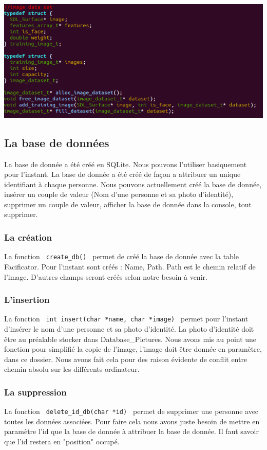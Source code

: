 \documentclass[12pt,a4paper]{article}
\begin{document}
\vspace{0.8cm}
\includegraphics[scale=.5]{Pictures/sdl2.png}
\vspace{0.8cm}

\newpage
\subsection{La base de données}
La base de donnée a été créé en SQLite. Nous pouvons l'utiliser basiquement pour l'instant. La base de donnée a été créé de façon a attribuer un unique identifiant à chaque personne. Nous pouvons actuellement créé la base de donnée, insérer un couple de valeur (Nom d'une personne et sa photo d'identité), supprimer un couple de valeur, afficher la base de donnée dans la console, tout supprimer.

\subsubsection{La création}
La fonction \verb| create_db() | permet de créé la base de donnée avec la table Facificator. Pour l'instant sont créés : Name, Path. Path est le chemin relatif de l'image. D'autres champs seront créés selon notre besoin à venir.

\subsubsection{L'insertion}
La fonction \verb| int insert(char *name, char *image) | permet pour l'instant d'insérer le nom d'une personne et sa photo d'identité. La photo d'identité doit être au préalable stocker dans Database\_Pictures. Nous avons mis au point une fonction pour simplifié la copie de l'image, l'image doit être donnée en paramètre, dans ce dossier. Nous avons fait cela pour des raison évidente de conflit entre chemin absolu sur les différents ordinateur.
\subsubsection{La suppression}
La fonction \verb| delete_id_db(char *id) | permet de supprimer une personne avec toutes les données associées. Pour faire cela nous avons juste besoin de mettre en paramètre l'id que la base de donnée à attribuer la base de donnée. Il faut savoir que l'id restera en "position" occupé.
\end{document}
